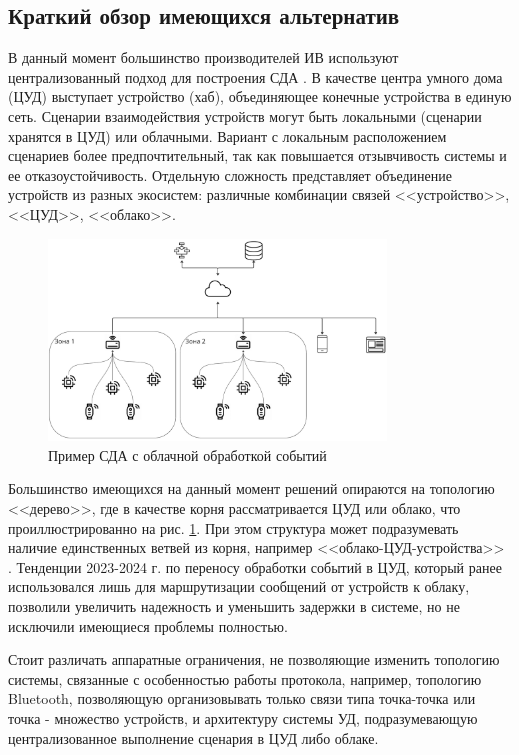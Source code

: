 \documentclass[a4paper,12pt]{article}
\begin{document}
\subsection{Краткий обзор имеющихся альтернатив}
В данный момент большинство производителей ИВ используют централизованный подход для построения СДА \cite{Rus_alternative}. В качестве центра умного дома (ЦУД) выступает устройство (хаб), объединяющее конечные устройства в единую сеть. Сценарии взаимодействия устройств могут быть локальными (сценарии хранятся в ЦУД) или облачными. Вариант с локальным расположением сценариев более предпочтительный, так как повышается отзывчивость системы и ее отказоустойчивость. Отдельную сложность представляет объединение устройств из разных экосистем: различные комбинации связей <<устройство>>, <<ЦУД>>, <<облако>>.
\begin{figure}[h]
    \centering
    \includegraphics[width=0.8\textwidth]{images/Fig03.png}
    \caption{Пример СДА с облачной обработкой событий}
    \label{fig:cloud_event_processing}
\end{figure}

Большинство имеющихся на данный момент решений опираются на топологию <<дерево>>, где в качестве корня рассматривается ЦУД или облако, что проиллюстрированно на рис. \ref{fig:cloud_event_processing}. При этом структура может подразумевать наличие единственных ветвей из корня, например <<облако-ЦУД-устройства>> \cite{smart_home_review}. Тенденции 2023-2024 г. по переносу обработки событий в ЦУД, который ранее использовался лишь для маршрутизации сообщений от устройств к облаку, позволили увеличить надежность и уменьшить задержки в системе, но не исключили имеющиеся проблемы полностью.

Стоит различать аппаратные ограничения, не позволяющие изменить топологию системы, связанные с особенностью работы протокола, например, топологию Bluetooth, позволяющую организовывать только связи типа точка-точка или точка - множество устройств, и архитектуру системы УД, подразумевающую централизованное выполнение сценария в ЦУД либо облаке.
\end{document}
